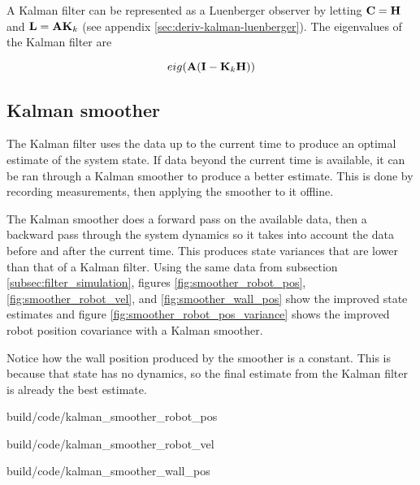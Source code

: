 A Kalman filter can be represented as a Luenberger \gls{observer} by letting
$\mathbf{C} = \mathbf{H}$ and $\mathbf{L} = \mathbf{A} \mathbf{K}_k$ (see appendix
\ref{sec:deriv-kalman-luenberger}). The eigenvalues of the Kalman filter are

\begin{equation}
  eig(\mathbf{A}(\mathbf{I} - \mathbf{K}_k\mathbf{H}))
\end{equation}

\subsection{Kalman smoother}

The Kalman filter uses the data up to the current time to produce an optimal
estimate of the system state. If data beyond the current time is available, it
can be ran through a Kalman smoother to produce a better estimate. This is done
by recording measurements, then applying the smoother to it offline.

The Kalman smoother does a forward pass on the available data, then a backward
pass through the system dynamics so it takes into account the data before and
after the current time. This produces state variances that are lower than that
of a Kalman filter. Using the same data from subsection
\ref{subsec:filter_simulation}, figures \ref{fig:smoother_robot_pos},
\ref{fig:smoother_robot_vel}, and \ref{fig:smoother_wall_pos} show the improved
state estimates and figure \ref{fig:smoother_robot_pos_variance} shows the
improved robot position covariance with a Kalman smoother.

Notice how the wall position produced by the smoother is a constant. This is
because that \gls{state} has no dynamics, so the final estimate from the Kalman
filter is already the best estimate.

\begin{svg}{build/code/kalman_smoother_robot_pos}
  \caption{Robot position with Kalman smoother}
  \label{fig:smoother_robot_pos}
\end{svg}

\begin{svg}{build/code/kalman_smoother_robot_vel}
  \caption{Robot velocity with Kalman smoother}
  \label{fig:smoother_robot_vel}
\end{svg}

\begin{svg}{build/code/kalman_smoother_wall_pos}
  \caption{Wall position with Kalman smoother}
  \label{fig:smoother_wall_pos}
\end{svg}

